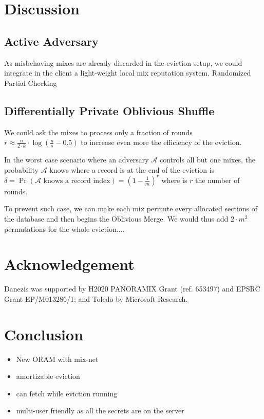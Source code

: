 \documentclass{llncs}
\begin{document}
\section{Discussion}\label{Discussion}

\subsection{Active Adversary}\label{Active Adversary}
As misbehaving mixes are already discarded in the eviction setup, we could integrate in the client a light-weight local mix reputation system.
Randomized Partial Checking


\subsection{Differentially Private Oblivious Shuffle}\label{DPOS}
We could ask the mixes to process only a fraction of rounds $r \approx \frac{n}{2\cdot k }  \cdot \log \left (\frac{n}{s}-0.5 \right)$ to increase even more the efficiency of the eviction.

In the worst case scenario where an adversary $\mathcal{A}$ controls all but one mixes, the probability  $\mathcal{A}$ knows where a record is at the end of the eviction is $\delta= \Pr \left ( \mathcal{A} \text{ knows a record index}\right ) = \left ( 1 - \frac{1}{m} \right )^r$ where is $r$ the number of rounds.

To prevent such case, we can make each mix permute every allocated sections of the database and then begins the Oblivious Merge. We would thus add $2 \cdot m^2$ permutations for the whole eviction....

\section{Acknowledgement}
Danezis was supported by H2020  PANORAMIX Grant (ref. 653497) and EPSRC Grant EP/M013286/1; and Toledo by Microsoft Research.


\section{Conclusion}\label{Conclusion}
\begin{itemize}
 \item New ORAM with mix-net
 \item amortizable eviction
 \item can fetch while eviction running
 \item multi-user friendly as all the secrets are on the server
\end{itemize}
\end{document}
